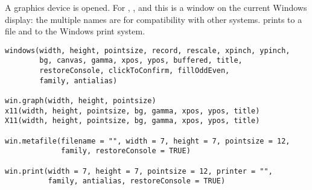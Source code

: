 \aliasA{[.SavedPlots}{windows}{[.SavedPlots}
%
\begin{Description}\relax
A graphics device is opened.  For , ,
 and  this is a window on the current
Windows display: the multiple names are for compatibility with other
systems.   prints to a file and  to
the Windows print system.
\end{Description}
%
\begin{Usage}
\begin{verbatim}
windows(width, height, pointsize, record, rescale, xpinch, ypinch,
        bg, canvas, gamma, xpos, ypos, buffered, title,
        restoreConsole, clickToConfirm, fillOddEven,
        family, antialias)

win.graph(width, height, pointsize)
x11(width, height, pointsize, bg, gamma, xpos, ypos, title)
X11(width, height, pointsize, bg, gamma, xpos, ypos, title)

win.metafile(filename = "", width = 7, height = 7, pointsize = 12,
             family, restoreConsole = TRUE)

win.print(width = 7, height = 7, pointsize = 12, printer = "",
          family, antialias, restoreConsole = TRUE)
\end{verbatim}
\end{Usage}
%
